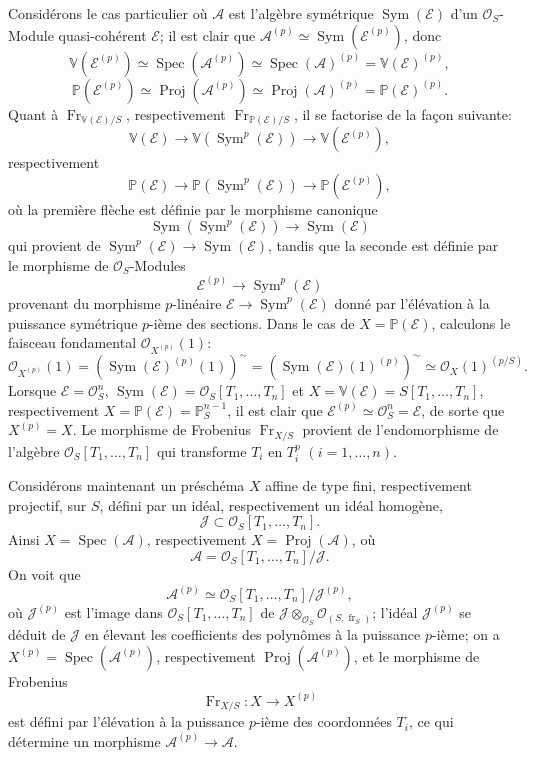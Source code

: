 \documentclass[11pt]{article}
\DeclareMathOperator{\Spec}{Spec}
\providecommand{\OO}{\mathcal{O}}
\providecommand{\cE}{\mathcal E}
\providecommand{\Spec}{\operatorname{Spec}}
\providecommand{\Sym}{\operatorname{Sym}}
\providecommand{\Spec}{\operatorname{Spec}}
\providecommand{\Spec}{\operatorname{Spec}}
\providecommand{\fr}{\operatorname{fr}}
\providecommand{\Fr}{\operatorname{Fr}}
\providecommand{\Proj}{\operatorname{Proj}}
\providecommand{\Sym}{\operatorname{Sym}}
\providecommand{\JJ}{\mathcal J}
\begin{document}
Considérons le cas particulier où $\mathcal{A}$ est l'algèbre symétrique $\Sym(\cE)$ d'un $\OO_S$-Module quasi-cohérent $\cE$; il est clair que $\mathcal{A}^{(p)}\simeq\Sym(\cE^{(p)})$, donc
\[
\mathbb V(\cE^{(p)})\simeq\Spec(\mathcal{A}^{(p)})\simeq\Spec(\mathcal{A})^{(p)}=\mathbb V(\cE)^{(p)},
\]
\[
\mathbb P(\cE^{(p)})\simeq\Proj(\mathcal{A}^{(p)})\simeq\Proj(\mathcal{A})^{(p)}=\mathbb P(\cE)^{(p)}.
\]
Quant à $\Fr_{\mathbb V(\cE)/S}$, respectivement $\Fr_{\mathbb P(\cE)/S}$, il se factorise de la façon suivante:
\[
\mathbb V(\cE)\longrightarrow \mathbb V(\Sym^p(\cE))\longrightarrow \mathbb V(\cE^{(p)}),
\]
respectivement
\[
\mathbb P(\cE)\longrightarrow \mathbb P(\Sym^p(\cE))\longrightarrow \mathbb P(\cE^{(p)}),
\]
où la première flèche est définie par le morphisme canonique
\[
\Sym(\Sym^p(\cE))\longrightarrow \Sym(\cE)
\]
qui provient de $\Sym^p(\cE)\to\Sym(\cE)$, tandis que la seconde est définie par le morphisme de $\OO_S$-Modules
\[
\cE^{(p)}\longrightarrow \Sym^p(\cE)
\]
provenant du morphisme $p$-linéaire $\cE\to\Sym^p(\cE)$ donné par l'élévation à la puissance symétrique $p$-ième des sections. Dans le cas de $X=\mathbb P(\cE)$, calculons le faisceau fondamental $\OO_{X^{(p)}}(1)$:
\[
\OO_{X^{(p)}}(1)=(\Sym(\cE)^{(p)}(1))^{\sim}
=(\Sym(\cE)(1)^{(p)})^{\sim}
\simeq \OO_X(1)^{(p/S)}.
\]
Lorsque $\cE=\OO_S^n$, $\Sym(\cE)=\OO_S[T_1,\ldots,T_n]$ et $X=\mathbb V(\cE)=S[T_1,\ldots,T_n]$, respectivement $X=\mathbb P(\cE)=\mathbb P_S^{n-1}$, il est clair que $\cE^{(p)}\simeq\OO_S^n=\cE$, de sorte que $X^{(p)}=X$. Le morphisme de Frobenius $\Fr_{X/S}$ provient de l'endomorphisme de l'algèbre $\OO_S[T_1,\ldots,T_n]$ qui transforme $T_i$ en $T_i^p$ $(i=1,\ldots,n)$.

Considérons maintenant un préschéma $X$ affine de type fini, respectivement projectif, sur $S$, défini par un idéal, respectivement un idéal homogène,
\[
\JJ\subset \OO_S[T_1,\ldots,T_n].
\]
Ainsi $X=\Spec(\mathcal{A})$, respectivement $X=\Proj(\mathcal{A})$, où
\[
\mathcal{A}=\OO_S[T_1,\ldots,T_n]/\JJ.
\]
On voit que
\[
\mathcal{A}^{(p)}\simeq \OO_S[T_1,\ldots,T_n]/\JJ^{(p)},
\]
où $\JJ^{(p)}$ est l'image dans $\OO_S[T_1,\ldots,T_n]$ de $\JJ\otimes_{\OO_S}\OO_{(S,\fr_S)}$; l'idéal $\JJ^{(p)}$ se déduit de $\JJ$ en élevant les coefficients des polynômes à la puissance $p$-ième; on a $X^{(p)}=\Spec(\mathcal{A}^{(p)})$, respectivement $\Proj(\mathcal{A}^{(p)})$, et le morphisme de Frobenius
\[
\Fr_{X/S}:X\longrightarrow X^{(p)}
\]
est défini par l'élévation à la puissance $p$-ième des coordonnées $T_i$, ce qui détermine un morphisme $\mathcal{A}^{(p)}\to\mathcal{A}$.
\end{document}
